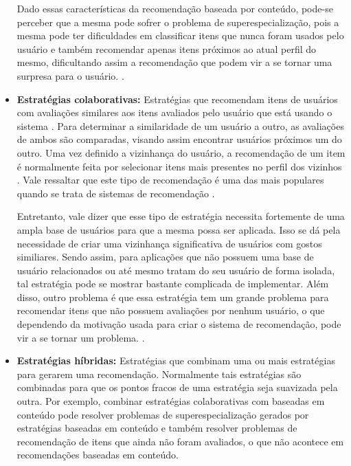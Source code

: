 \begin{itemize}
        Dado essas características da recomendação baseada por conteúdo, pode-se
        perceber que a mesma pode sofrer o problema de superespecialização, pois
        a mesma pode ter dificuldades em classificar itens que nunca foram
        usados pelo usuário e também recomendar apenas itens próximos ao atual
        perfil do mesmo, dificultando assim a recomendação que podem vir a se
        tornar uma surpresa para o usuário. \cite{lops2011content}.

    \item \textbf{Estratégias colaborativas:} Estratégias que recomendam itens
        de usuários com avaliações similares aos itens avaliados pelo usuário
        que está usando o sistema \cite{schafer2007collaborative}.
        Para determinar a similaridade de um usuário a outro, as avaliações de
        ambos são comparadas, visando assim encontrar usuários próximos um do
        outro. Uma vez definido a vizinhança do usuário, a recomendação de um
        item é normalmente feita por selecionar itens mais presentes no perfil
        dos vizinhos \cite{araujo2011apprecommender}. Vale ressaltar que este tipo de recomendação é uma das mais
        populares quando se trata de sistemas de recomendação
        \cite{ricci2011introduction}.

        Entretanto, vale dizer que esse tipo de estratégia necessita fortemente
        de uma ampla base de usuários para que a mesma possa ser aplicada. Isso
        se dá pela necessidade de criar uma vizinhança significativa de usuários
        com gostos similiares. Sendo assim, para aplicações que não possuem uma
        base de usuário relacionados ou até mesmo tratam do seu usuário de forma
        isolada, tal estratégia pode se mostrar bastante complicada de
        implementar. Além disso, outro problema é que essa estratégia tem um
        grande problema para recomendar itens que não possuem avaliações por
        nenhum usuário, o que dependendo da motivação usada para criar o sistema
        de recomendação, pode vir a se tornar um problema.
        \cite{ricci2011introduction}.


    \item \textbf{Estratégias híbridas: } Estratégias que combinam uma ou mais
        estratégias para gerarem uma recomendação. Normalmente tais estratégias
        são combinadas para que os pontos fracos de uma estratégia seja
        suavizada pela outra. Por exemplo, combinar estratégias colaborativas com
        baseadas em conteúdo pode resolver problemas de superespecialização
        gerados por estratégias baseadas em conteúdo e também resolver problemas
        de recomendação de itens que ainda não foram avaliados, o que não
        acontece em recomendações baseadas em conteúdo.

\end{itemize}


